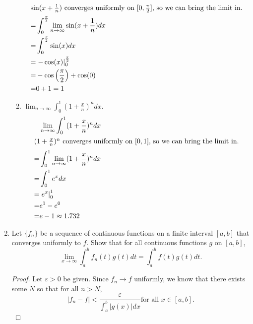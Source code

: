 \documentclass{article}
\begin{document}
\begin{enumerate}
\begin{enumerate}
\begin{align*}
                              \intertext{$\sin (x+\frac{1}{n})$ converges uniformly on $[0,{\frac{\pi}{2}}]$, so we can bring the limit in.}
                              = & \int_0^{\frac{\pi}{2}}\lim_{n\to \infty}\sin (x+\frac{1}{n})dx \\
                              = & \int_0^{\frac{\pi}{2}}\sin(x)dx                                \\
                              = & \left.-\cos(x)\right\rvert_0^{\frac{\pi}{2}}                   \\
                              = & -\cos\left({\frac{\pi}{2}}\right)+\cos(0)                      \\
                              = & 0 + 1 = 1
                        \end{align*}
                  \item $\lim_{n\to \infty}\int_0^1(1+\frac{x}{n})^ndx$.
                        \begin{align*}
                                & \lim_{n\to \infty}\int_0^1(1+\frac{x}{n})^ndx \\
                              \intertext{$(1+\frac{x}{n})^n$ converges uniformly on $[0,1]$, so we can bring the limit in.}
                              = & \int_0^1\lim_{n\to \infty}(1+\frac{x}{n})^ndx \\
                              = & \int_0^1e^xdx                                 \\
                              = & \left.e^x\right\rvert_0^1                     \\
                              = & e^1-e^0                                       \\
                              = & e-1 \approx 1.732
                        \end{align*}
            \end{enumerate}
            \setcounter{enumi}{3}
      \item Let $\{f_n\}$ be a sequence of continuous functions on a finite
            interval $[a,b]$ that converges uniformly to $f$. Show that for
            all continuous functions $g$ on $[a,b]$,
            \[
                  \lim_{x \to \infty}\int_a^bf_n(t)g(t)dt = \int_a^bf(t)g(t)dt.
            \]
            \begin{proof}
                  Let $\varepsilon>0$ be given. Since $f_n\to f$ uniformly, we
                  know that there exists some $N$ so that for all $n>N$,
                  \[
                        \lvert f_n-f\rvert < \frac{\varepsilon}{\int_a^b\lvert g(x)\rvert dx} \text{for all }x\in [a,b].
\]
\end{proof}
\end{enumerate}
\end{document}
